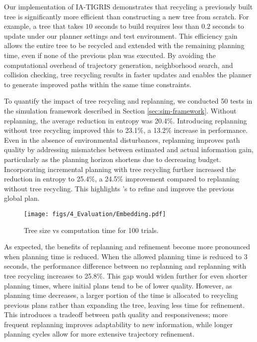Our implementation of IA-TIGRIS demonstrates that recycling a previously built tree is significantly more efficient than constructing a new tree from scratch. For example, a tree that takes $10$ seconds to build requires less than $0.2$ seconds to update under our planner settings and test environment. This efficiency gain allows the entire tree to be recycled and extended with the remaining planning time, even if none of the previous plan was executed. By avoiding the computational overhead of trajectory generation, neighborhood search, and collision checking, tree recycling results in faster updates and enables the planner to generate improved paths within the same time constraints.

To quantify the impact of tree recycling and replanning, we conducted 50 tests in the simulation framework described in Section \ref{sec:sim-framework}. Without replanning, the average reduction in entropy was 20.4\%. Introducing replanning without tree recycling improved this to 23.1\%, a 13.2\% increase in performance. Even in the absence of environmental disturbances, replanning improves path quality by addressing mismatches between estimated and actual information gain, particularly as the planning horizon shortens due to decreasing budget. Incorporating incremental planning with tree recycling further increased the reduction in entropy to 25.4\%, a 24.5\% improvement compared to replanning without tree recycling. This highlights \PlannerName's to refine and improve the previous global plan.

\begin{figure}[t]
    \centering
    \texttt{[image: figs/4\_Evaluation/Embedding.pdf]}
    \caption{Tree size vs computation time for 100 trials.}
    \label{fig:node-embedding}
\end{figure}

As expected, the benefits of replanning and refinement become more pronounced when planning time is reduced. When the allowed planning time is reduced to 3 seconds, the performance difference between no replanning and replanning with tree recycling increases to 25.8\%. This gap would widen further for even shorter planning times, where initial plans tend to be of lower quality. 
However, as planning time decreases, a larger portion of the time is allocated to recycling previous plans rather than expanding the tree, leaving less time for refinement. This introduces a tradeoff between path quality and responsiveness; more frequent replanning improves adaptability to new information, while longer planning cycles allow for more extensive trajectory refinement.



